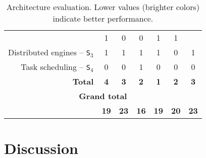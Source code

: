 \documentclass[preprint,3p,twocolumn]{elsarticle}
\begin{document}
\begin{table*}
\begin{tabular}{rcccccc}
                                     & \cellcolor[HTML]{99DD99}1
                                     & \cellcolor[HTML]{99FF99}0
                                     & \cellcolor[HTML]{99FF99}0
                                     & \cellcolor[HTML]{99DD99}1
                                     & \cellcolor[HTML]{99DD99}1 \\
Distributed engines -- \texttt{S$_3$}& \cellcolor[HTML]{99AA99}1
                                     & \cellcolor[HTML]{99AA99}1
                                     & \cellcolor[HTML]{99AA99}1
                                     & \cellcolor[HTML]{99AA99}1
                                     & \cellcolor[HTML]{99FF99}0
                                     & \cellcolor[HTML]{99AA99}1 \\
Task scheduling -- \texttt{S$_4$}    & \cellcolor[HTML]{99FF99}0
                                     & \cellcolor[HTML]{99FF99}0
                                     & \cellcolor[HTML]{99AA99}1
                                     & \cellcolor[HTML]{99FF99}0
                                     & \cellcolor[HTML]{99FF99}0
                                     & \cellcolor[HTML]{99FF99}0 \\
\textbf{Total}                       & \cellcolor[HTML]{99AA99}\textbf{4}
                                     & \cellcolor[HTML]{99BB99}\textbf{3}
                                     & \cellcolor[HTML]{99DD99}\textbf{2}
                                     & \cellcolor[HTML]{99FF99}\textbf{1}
                                     & \cellcolor[HTML]{99DD99}\textbf{2}
                                     & \cellcolor[HTML]{99BB99}\textbf{3} \\
\multicolumn{7}{c}{\cellcolor[HTML]{EEEEEE}\textbf{Grand total}}\\
                                     & \cellcolor[HTML]{99CC99}\textbf{19}
                                     & \cellcolor[HTML]{99BB99}\textbf{23}
                                     & \cellcolor[HTML]{99FF99}\textbf{16}
                                     & \cellcolor[HTML]{99CC99}\textbf{19}
                                     & \cellcolor[HTML]{99DD99}\textbf{20}
                                     & \cellcolor[HTML]{99AA99}\textbf{23}
\end{tabular}
\caption{Architecture evaluation. Lower values (brighter colors) indicate better performance.}
\label{table:evaluation}
\end{table*}



\section{Discussion}
\end{document}
